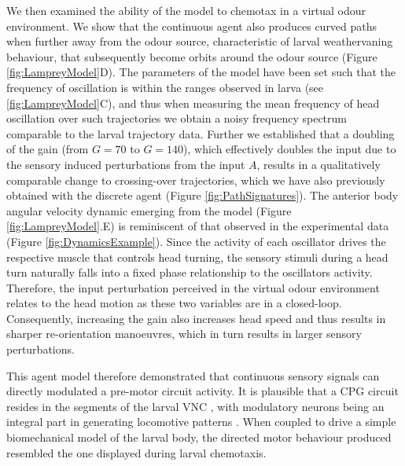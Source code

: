 \documentclass[11pt,a4paper]{article}
\begin{document}
We then examined the ability of the model to chemotax in a virtual odour environment. We show that the continuous agent also produces curved paths when further away from the odour source, characteristic of larval weathervaning behaviour, that subsequently become orbits around the odour source (Figure \ref{fig:LampreyModel}D). The parameters of the model have been set such that the frequency of oscillation is within the ranges observed in larva (see \ref{fig:LampreyModel}C), and thus when measuring the mean frequency of head oscillation over such trajectories we obtain a noisy frequency spectrum comparable to the larval trajectory data. 
Further we established that a doubling of the gain (from $G=70$ to $G=140$), which effectively doubles the input due to the sensory induced perturbations from the input $A$, results in a qualitatively comparable change to crossing-over trajectories, which we have also previously obtained with the discrete agent (Figure \ref{fig:PathSignatures}). The anterior body angular velocity dynamic emerging from the model (Figure \ref{fig:LampreyModel}.E) is reminiscent of that observed in the experimental data (Figure \ref{fig:DynamicsExample}).
Since the activity of each oscillator drives the respective muscle that controls head turning, the sensory stimuli during a head turn naturally falls into a fixed phase relationship to the oscillators activity. Therefore, the input perturbation perceived in the virtual odour environment relates to the head motion as these two variables are in a closed-loop. 
Consequently, increasing the gain also increases head speed and thus results in sharper re-orientation manoeuvres, which in turn results in larger sensory perturbations.
 
This agent model therefore demonstrated that continuous sensory signals can  directly modulated a pre-motor circuit activity. It is plausible that a CPG circuit resides in the segments of the larval VNC \citep{kohsaka2012development}, with modulatory neurons being an integral part in generating locomotive patterns \citep{suster2003targeted}. When coupled to drive a simple biomechanical model of the larval body, the directed motor behaviour produced resembled the one displayed during larval chemotaxis.
\end{document}
